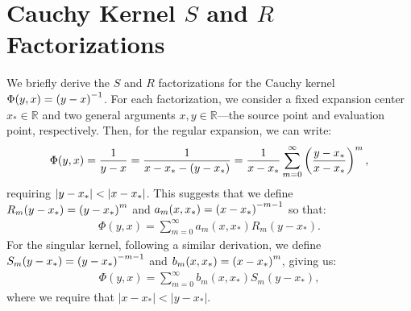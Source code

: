 \section{Cauchy Kernel $S$ and $R$ Factorizations}

We briefly derive the $S$
and $R$
factorizations for the Cauchy kernel $\Phi(y, x) = \left(y - x\right)^{-1}$.
For each factorization, we consider a fixed expansion center
$x_* \in \mathbb{R}$
and two general arguments $x, y \in \mathbb{R}$\----the source point and evaluation point, respectively.  Then, for
the regular expansion, we can write:
\begin{align*}
  \Phi(y, x) = {1 \over y - x} = {1 \over x - x_* - (y - x_*)} = {1 \over x - x_*} \sum_{m=0}^\infty \left(y - x_* \over x - x_*\right)^m,
\end{align*}
requiring $\left|y - x_*\right| < \left|x - x_*\right|$.
This suggests that we define $R_m(y - x_*) = \left(y - x_*\right)^m$ and $a_m(x, x_*) = \left(x - x_*\right)^{-m-1}$ so that:
\begin{align*}
  \Phi(y, x) = \sum_{m=0}^\infty a_m(x, x_*) R_m(y - x_*).
\end{align*}
For the singular kernel, following a similar derivation, we define $S_m(y - x_*) = \left(y - x_*\right)^{-m-1}$ and $b_m(x, x_*) = \left(x - x_*\right)^m$, giving us:
\begin{align*}
  \Phi(y, x) = \sum_{m=0}^\infty b_m(x, x_*) S_m(y - x_*),
\end{align*}
where we require that $|x - x_*| < |y - x_*|$. \\
